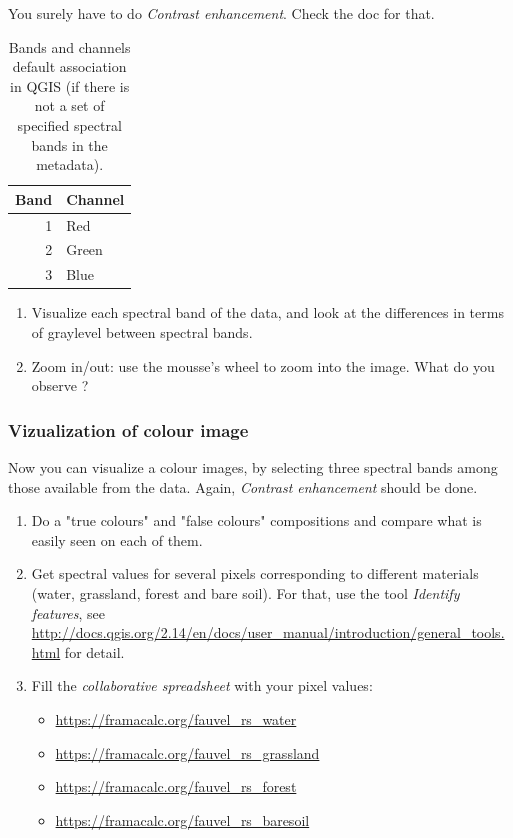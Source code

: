 \documentclass[a4paper,11pt,DIV=18]{scrartcl}
\begin{document}
You surely have to do \emph{Contrast enhancement}. Check the doc for that.

\begin{table}[htbp]
\caption{\label{tab:org60ddc22}
Bands and channels default association in QGIS (if there is not a set of specified spectral bands in the metadata).}
\centering
\begin{tabular}{rl}
\toprule
Band & Channel\\
\midrule
1 & Red\\
2 & Green\\
3 & Blue\\
\bottomrule
\end{tabular}
\end{table}

\begin{work}
\begin{enumerate}
\item Visualize  each  spectral  band  of the  data,  and  look  at  the
differences in terms of graylevel between spectral bands.
\item Zoom in/out: use the mousse's wheel to zoom into the image. What do
you observe ?
\end{enumerate}
\end{work}
\subsubsection{Vizualization of colour image}
\label{sec:orga1bdac1}
Now you  can visualize  a colour images,  by selecting  three spectral
bands among those available  from the data. Again, \emph{Contrast
enhancement} should be done.

\begin{work}
\begin{enumerate}
\item Do a "true colours" and "false colours" compositions and compare what
is easily seen on each of them.
\item Get spectral  values for several pixels  corresponding to different
materials  (water,  grassland,  forest  and bare  soil). For that,
use the tool \emph{Identify features}, see
\url{http://docs.qgis.org/2.14/en/docs/user\_manual/introduction/general\_tools.html}
for detail.
\item Fill  the \emph{collaborative spreadsheet}  with your pixel values:
\begin{itemize}
\item \url{https://framacalc.org/fauvel\_rs\_water}
\item \url{https://framacalc.org/fauvel\_rs\_grassland}
\item \url{https://framacalc.org/fauvel\_rs\_forest}
\item \url{https://framacalc.org/fauvel\_rs\_baresoil}
\end{itemize}
\end{enumerate}
\end{work}
\end{document}
